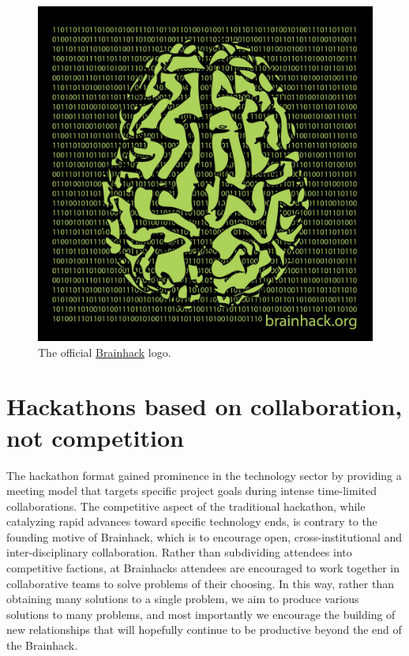 \documentclass[11pt]{bmc_article_s50}
\begin{document}
\begin{figure}[ht!]
\begin{center}
\includegraphics[width=.5\textwidth]{brainhack_greenbrain}

 \caption{The official \href{http://www.brainhack.org}{Brainhack} logo.}
 \end{center}
\end{figure}


\section{Hackathons based on collaboration, not
competition}\label{hackathons-based-on-collaboration-not-competition}

The hackathon format gained prominence in the technology sector by providing a meeting model that targets specific project goals during intense time-limited collaborations. The competitive aspect of the traditional hackathon, while catalyzing rapid advances toward specific technology ends, is contrary to the founding motive of Brainhack, which is to encourage open, cross-institutional and inter-disciplinary collaboration. Rather than subdividing attendees into competitive factions, at Brainhacks attendees are encouraged to work together in collaborative teams to solve problems of their choosing. In this way,  rather than obtaining many solutions to a single problem, we aim to produce various solutions to many problems,  and most importantly we encourage the building of new relationships that will hopefully continue to be productive beyond the end of the Brainhack.
\end{document}
